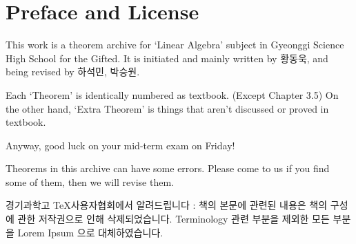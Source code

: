 \chapter*{Preface and License}
This work is a theorem archive for `Linear Algebra' subject in Gyeonggi Science High School for the Gifted. It is initiated and mainly written by 황동욱, and being revised by 하석민, 박승원.

Each `Theorem' is identically numbered as textbook. (Except Chapter 3.5) On the other hand, `Extra Theorem' is things that aren't discussed or proved in textbook.

Anyway, good luck on your mid-term exam on Friday!

Theorems in this archive can have some errors. Please come to us if you find some of them, then we will revise them.

경기과학고 \TeX 사용자협회에서 알려드립니다 : 책의 본문에 관련된 내용은 책의 구성에 관한 저작권으로 인해 삭제되었습니다. Terminology 관련 부분을 제외한 모든 부분을 Lorem Ipsum 으로 대체하였습니다.
\begin{comment}

This work is licensed under a Creative Commons Attribution-NonCommercial-ShareAlike 4.0 International License.
\begin{figure}[h]
	\centering
	\texttt{[image: by-nc-sa.pdf]}
\end{figure} \footnote{\url{http://creativecommons.org/licenses/by-nc-sa/4.0/}}
\end{comment}